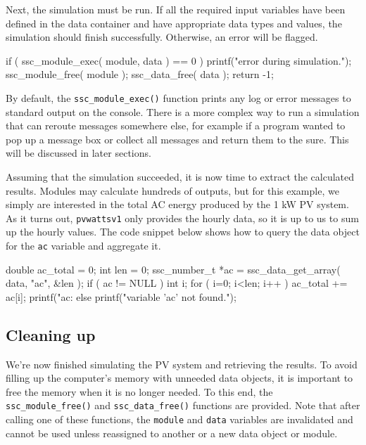 \documentclass{article}
\begin{document}
Next, the simulation must be run.  If all the required input variables have been defined in the data container and have appropriate data types and values, the simulation should finish successfully.  Otherwise, an error will be flagged.  

\begin{verbatimtab}[4]
	if ( ssc_module_exec( module, data ) == 0 )
	{
		printf("error during simulation.\n");
		ssc_module_free( module );
		ssc_data_free( data );
		return -1;
	}
\end{verbatimtab}

By default, the \texttt{ssc\_module\_exec()} function prints any log or error messages to standard output on the console.  There is a more complex way to run a simulation that can reroute messages somewhere else, for example if a program wanted to pop up a message box or collect all messages and return them to the sure.  This will be discussed in later sections.

Assuming that the simulation succeeded, it is now time to extract the calculated results.  Modules may calculate hundreds of outputs, but for this example, we simply are interested in the total AC energy produced by the 1 kW PV system.  As it turns out, \texttt{pvwattsv1} only provides the hourly data, so it is up to us to sum up the hourly values.  The code snippet below shows how to query the data object for the \texttt{ac} variable and aggregate it.

\begin{verbatimtab}[4]
	double ac_total = 0;
	int len = 0;
	ssc_number_t *ac = ssc_data_get_array( data, "ac", &len );
	if ( ac != NULL )
	{
		int i;
		for ( i=0; i<len; i++ )
			ac_total += ac[i];
		printf("ac: %
	}
	else
	{
		printf("variable 'ac' not found.\n");
	}
\end{verbatimtab}

\subsection{Cleaning up}

We're now finished simulating the PV system and retrieving the results.  To avoid filling up the computer's memory with unneeded data objects, it is important to free the memory when it is no longer needed.  To this end, the \texttt{ssc\_module\_free()} and \texttt{ssc\_data\_free()} functions are provided.  Note that after calling one of these functions, the \texttt{module} and \texttt{data} variables are invalidated and cannot be used unless reassigned to another or a new data object or module.
\end{document}
